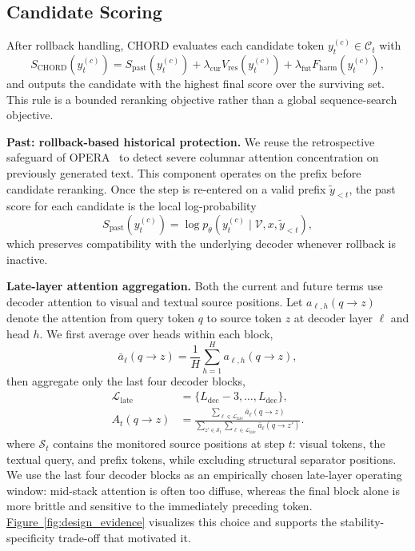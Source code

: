 \documentclass[sigconf,anonymous]{acmart}
\newcommand{\Fref}[1]{\hyperref[#1]{Figure~\ref*{#1}}}
\begin{document}
\subsection{Candidate Scoring}
\label{sec:astar}

After rollback handling, CHORD evaluates each candidate token $y_t^{(c)} \in \mathcal{C}_t$ with
\begin{equation}
    S_{\mathrm{CHORD}}(y_t^{(c)}) = S_{\mathrm{past}}(y_t^{(c)}) + \lambda_{\mathrm{cur}} V_{\mathrm{res}}(y_t^{(c)}) + \lambda_{\mathrm{fut}} F_{\mathrm{harm}}(y_t^{(c)}),
\end{equation}
and outputs the candidate with the highest final score over the surviving set. This rule is a bounded reranking objective rather than a global sequence-search objective.

\noindent\textbf{Past: rollback-based historical protection.} We reuse the retrospective safeguard of OPERA~\cite{huang2024opera_cvpr} to detect severe columnar attention concentration on previously generated text. This component operates on the prefix before candidate reranking. Once the step is re-entered on a valid prefix $\tilde{y}_{<t}$, the past score for each candidate is the local log-probability
\begin{equation}
    S_{\mathrm{past}}(y_t^{(c)}) = \log p_\theta(y_t^{(c)} \mid \mathcal{V}, x, \tilde{y}_{<t}),
\end{equation}
which preserves compatibility with the underlying decoder whenever rollback is inactive.

\noindent\textbf{Late-layer attention aggregation.} Both the current and future terms use decoder attention to visual and textual source positions. Let $a_{\ell,h}(q \rightarrow z)$ denote the attention from query token $q$ to source token $z$ at decoder layer $\ell$ and head $h$. We first average over heads within each block,
\begin{equation}
    \bar{a}_{\ell}(q \rightarrow z) = \frac{1}{H}\sum_{h=1}^{H} a_{\ell,h}(q \rightarrow z),
\end{equation}
then aggregate only the last four decoder blocks,
\begin{equation}
    \begin{aligned}
        \mathcal{L}_{\mathrm{late}} &= \{L_{\mathrm{dec}}-3,\ldots,L_{\mathrm{dec}}\}, \\
        A_t(q \rightarrow z)
        &=
        \frac{\sum_{\ell \in \mathcal{L}_{\mathrm{late}}} \bar{a}_{\ell}(q \rightarrow z)}
        {\sum_{z' \in \mathcal{S}_t}\sum_{\ell \in \mathcal{L}_{\mathrm{late}}}
        \bar{a}_{\ell}(q \rightarrow z')}.
    \end{aligned}
\end{equation}
where $\mathcal{S}_t$ contains the monitored source positions at step $t$: visual tokens, the textual query, and prefix tokens, while excluding structural separator positions. We use the last four decoder blocks as an empirically chosen late-layer operating window: mid-stack attention is often too diffuse, whereas the final block alone is more brittle and sensitive to the immediately preceding token. \Fref{fig:design_evidence} visualizes this choice and supports the stability-specificity trade-off that motivated it.
\end{document}
